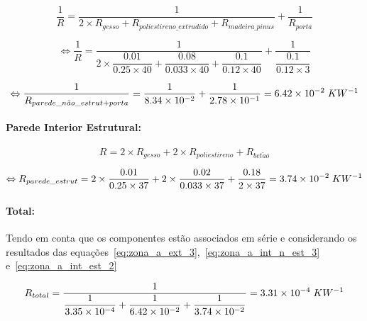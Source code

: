 \documentclass[12pt, a4paper]{article}
\begin{document}
\begin{equation}
    \dfrac{1}{R} =
			\dfrac{1}{
            2 \times R_{gesso} + R_{poliestireno\_extrudido} + R_{madeira\_pinus}
			}
			+
			\dfrac{1}{
				R_{porta}
			}
    \label{eq:zona_a_int_n_est_1}
\end{equation}

\begin{equation}
    \Leftrightarrow \dfrac{1}{R} =
			\dfrac{1}{
            2 \times \dfrac{0.01}{0.25 \times 40} +
            \dfrac{0.08}{0.033 \times 40} +
            \dfrac{0.1}{0.12 \times 40}
        	}
			+
			\dfrac{1}{
            \dfrac{0.1}{0.12 \times 3}
			}
    \label{eq:zona_a_int_n_est_2}
\end{equation}

\begin{equation}
    \Leftrightarrow \dfrac{1}{R_{parede\_n\tilde{a}o\_estrut + porta}} =
	\dfrac{1}{
        8.34 \times 10^{-2}
	} +
	\dfrac{1}{
    	2.78 \times 10^{-1}
	}
	= 6.42 \times 10^{-2} \hspace{1mm} KW^{-1}
    \label{eq:zona_a_int_n_est_3}
\end{equation}

\paragraph{Parede Interior Estrutural:}\label{par:zona_a_int_est}

\begin{equation}
	R= 2 \times R_{gesso} + 2 \times R_{poliestireno} + R_{bet\tilde{a}o}
	\label{eq:zona_a_int_est_1}
\end{equation}

\begin{equation}
	\Leftrightarrow R_{parede\_estrut} =
		2 \times \dfrac{0.01}{0.25 \times 37} +
		2 \times \dfrac{0.02}{0.033 \times 37} +
		\dfrac{0.18}{2 \times 37}
		= 3.74 \times 10^{-2} \hspace{1mm} KW^{-1}
	\label{eq:zona_a_int_est_2}
\end{equation}


\paragraph{Total:}\label{par:zona_a_total} Tendo em conta que os componentes est\~ao
associados em série e considerando os resultados das
equa\c{c}\~oes~\ref*{eq:zona_a_ext_3},~\ref*{eq:zona_a_int_n_est_3} e~\ref*{eq:zona_a_int_est_2}

\begin{equation}
	R_{total} =
	\dfrac{1}{
		\dfrac{1}{
		3.35 \times 10^{-4}
		} + 
		\dfrac{1}{
		6.42 \times 10^{-2}
		} + 
		\dfrac{1}{
		3.74 \times 10^{-2} 
		}
	}
	= 3.31 \times 10^{-4} \hspace{1mm} KW^{-1}
	\label{eq:zona_a_total}
\end{equation}
\end{document}
